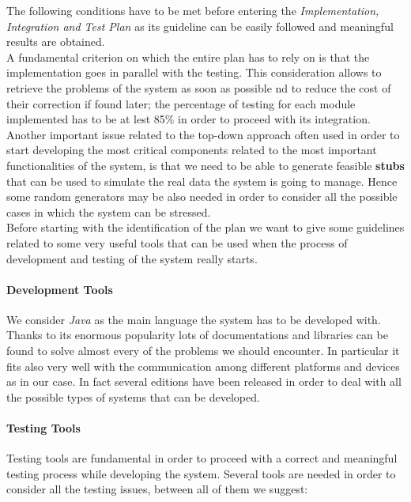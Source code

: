 		The following conditions have to be met before entering the \emph{Implementation, Integration and Test Plan} as its guideline can be easily followed and meaningful results are obtained.\\
		
		A fundamental criterion on which the entire plan has to rely on is that the implementation goes in parallel with the testing. This consideration allows to retrieve the problems of the system as soon as possible nd to reduce the cost of their correction if found later; the percentage of testing for each module implemented has to be at lest 85\% in order to proceed with its integration.\\
		
		Another important issue related to the top-down approach often used in order to start developing the most critical components related to the most important functionalities of the system, is that we need to be able to generate feasible \textbf{stubs} that can be used to simulate the real data the system is going to manage. Hence some random generators may be also needed in order to consider all the possible cases in which the system can be stressed.\\
		
		Before starting with the identification of the plan we want to give some guidelines related to some very useful tools that can be used when the process of development and testing of the system really starts.
		
		\paragraph{Development Tools} We consider \emph{Java} as the main language the system has to be developed with. Thanks to its enormous popularity lots of documentations and libraries can be found to solve almost every of the problems we should encounter. In particular it fits also very well with the communication among different platforms and devices as in our case. In fact several editions have been released in order to deal with all the possible types of systems that can be developed.
		
		\paragraph{Testing Tools} Testing tools are fundamental in order to proceed with a correct and meaningful testing process while developing the system. Several tools are needed in order to consider all the testing issues, between all of them we suggest:
		
